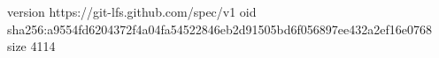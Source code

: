 version https://git-lfs.github.com/spec/v1
oid sha256:a9554fd6204372f4a04fa54522846eb2d91505bd6f056897ee432a2ef16e0768
size 4114
